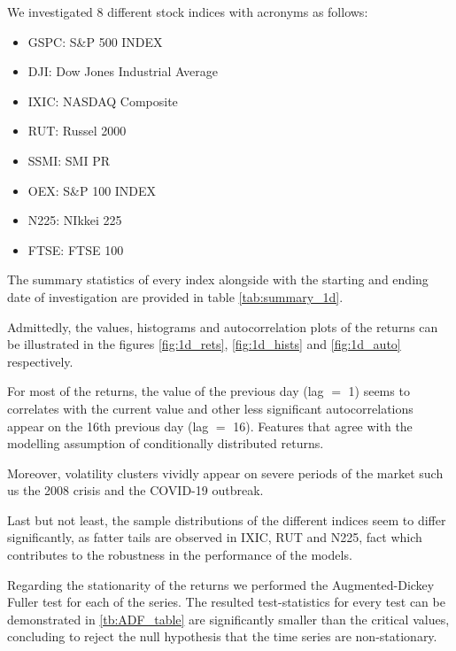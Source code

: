 \documentclass[a4paper, oneside]{discothesis}
\begin{document}
We investigated 8 different stock indices with acronyms as follows:
\begin{itemize}
\item GSPC: S\&P 500 INDEX
\item DJI: Dow Jones Industrial Average
\item IXIC: NASDAQ Composite
\item RUT: Russel 2000
\item SSMI: SMI PR
\item OEX: S\&P 100 INDEX
\item N225: NIkkei 225
\item FTSE: FTSE 100
\end{itemize}

The summary statistics of every index alongside with the starting and ending date of investigation are provided in table \ref{tab:summary_1d}.

Admittedly, the values, histograms and autocorrelation plots of the returns can be illustrated in the figures \ref{fig:1d_rets}, \ref{fig:1d_hists} and \ref{fig:1d_auto} respectively.

For most of the returns, the value of the previous day (lag $=$ 1) seems to correlates with the current value and other less significant autocorrelations appear on the 16th previous day (lag $=$ 16). Features that agree with the modelling assumption of conditionally distributed returns.

Moreover, volatility clusters vividly appear on severe periods of the market such us the 2008 crisis and the COVID-19 outbreak. 

Last but not least, the sample distributions of the different indices seem to differ significantly, as fatter tails are observed in IXIC, RUT and N225, fact which contributes to the robustness in the performance of the models.

Regarding the stationarity of the returns we performed the Augmented-Dickey Fuller test \cite{ADF} for each of the series. The resulted test-statistics for every test can be demonstrated in \ref{tb:ADF_table} are significantly smaller than the critical values, concluding to reject the null hypothesis that the time series are non-stationary.
\end{document}
